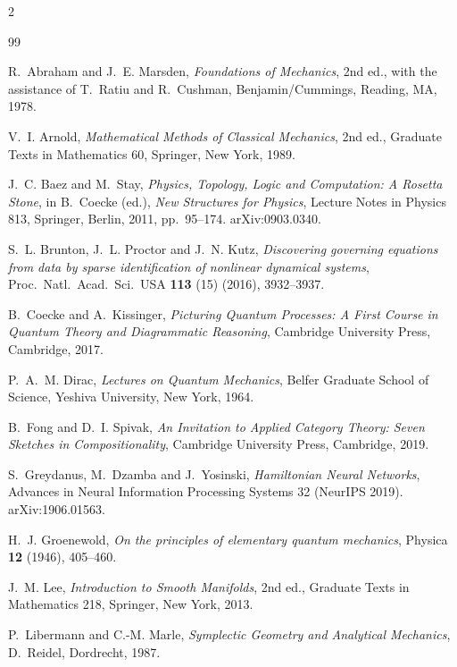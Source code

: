 \documentclass[10pt,a4paper]{article}
\theoremstyle{plain}
\theoremstyle{definition}
\begin{document}
{\scriptsize
\begin{multicols}{2}
\begin{thebibliography}{99}
\setlength{\itemsep}{0pt}\setlength{\parskip}{0pt}

 R.~Abraham and J.~E. Marsden, \emph{Foundations of Mechanics}, 2nd ed., with the assistance of T.~Ratiu and R.~Cushman, Benjamin/Cummings, Reading, MA, 1978.

 V.~I. Arnold, \emph{Mathematical Methods of Classical Mechanics}, 2nd ed., Graduate Texts in Mathematics 60, Springer, New York, 1989.

 J.~C. Baez and M.~Stay, \emph{Physics, Topology, Logic and Computation: A Rosetta Stone}, in B.~Coecke (ed.), \emph{New Structures for Physics}, Lecture Notes in Physics 813, Springer, Berlin, 2011, pp.~95--174. arXiv:0903.0340.

 S.~L. Brunton, J.~L. Proctor and J.~N. Kutz, \emph{Discovering governing equations from data by sparse identification of nonlinear dynamical systems}, Proc.\ Natl.\ Acad.\ Sci.\ USA \textbf{113} (15) (2016), 3932--3937.

 B.~Coecke and A.~Kissinger, \emph{Picturing Quantum Processes: A First Course in Quantum Theory and Diagrammatic Reasoning}, Cambridge University Press, Cambridge, 2017.

 P.~A.~M. Dirac, \emph{Lectures on Quantum Mechanics}, Belfer Graduate School of Science, Yeshiva University, New York, 1964.

 B.~Fong and D.~I. Spivak, \emph{An Invitation to Applied Category Theory: Seven Sketches in Compositionality}, Cambridge University Press, Cambridge, 2019.

 S.~Greydanus, M.~Dzamba and J.~Yosinski, \emph{Hamiltonian Neural Networks}, Advances in Neural Information Processing Systems 32 (NeurIPS 2019). arXiv:1906.01563.

 H.~J. Groenewold, \emph{On the principles of elementary quantum mechanics}, Physica \textbf{12} (1946), 405--460.

 J.~M. Lee, \emph{Introduction to Smooth Manifolds}, 2nd ed., Graduate Texts in Mathematics 218, Springer, New York, 2013.

 P.~Libermann and C.-M. Marle, \emph{Symplectic Geometry and Analytical Mechanics}, D.~Reidel, Dordrecht, 1987.


\end{thebibliography}
\end{multicols}}
\end{document}

